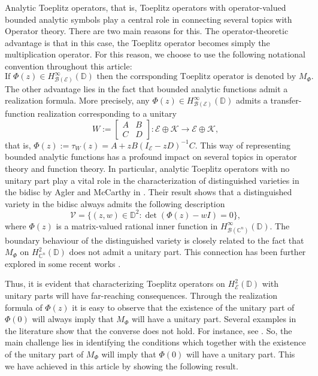 \documentclass[12pt]{amsart}
\numberwithin{equation}{section}
\theoremstyle{definition}
\newcommand{\D}{\mathbb{D}}
\newcommand{\1}{{\mbox{\bf 1}}}
\newcommand{\clb}{\mathcal{B}}
\newcommand{\cle}{\mathcal{E}}
\newcommand{\clk}{\mathcal{K}}
\newcommand{\raro}{\rightarrow}
\begin{document}
Analytic Toeplitz operators, that is, Toeplitz operators with operator-valued bounded analytic symbols play a central role in connecting several topics with Operator theory.  There are two main reasons for this. The operator-theoretic advantage is that in this case, the Toeplitz operator becomes simply the multiplication operator.  For this reason, we choose to use the following notational convention throughout this article: 
\[
\text{If } \Phi(z) \in H_{\clb(\cle)}^{\infty}(\D) \text{ then the corrsponding Toeplitz operator is denoted by } M_{\Phi}.
\]
The other advantage lies in the fact that bounded analytic functions admit a realization formula. More precisely, any $\Phi(z) \in H_{\clb(\cle)}^{\infty}(\D)$ admits a transfer-function realization corresponding to a unitary
\[
W:= \begin{bmatrix}
A &B\\
C &D
\end{bmatrix}:\cle \oplus \clk \raro \cle \oplus \clk,
\]
that is, $\Phi(z) := \tau_W(z) = A +zB(I_{\cle} - zD)^{-1}C$. This way of representing bounded analytic functions has a profound impact on several topics in operator theory and function theory.  In particular, analytic Toeplitz operators with no unitary part play a vital role in the characterization of distinguished varieties in the bidisc by Agler and McCarthy in \cite{AM}. Their result shows that a distinguished variety in the bidisc always admits the following description 
\[
\mathcal{V} = \{(z,w) \in \D^2: \det (\Phi(z) - wI)=0\},
\]
where $\Phi(z)$ is a matrix-valued rational inner function in $H_{\clb(\mathbb{C}^n)}^{\infty}(\D)$.  The boundary behaviour of the distinguished variety is closely related to the fact that $M_{\Phi}$ on $H_{\mathbb{C}^n}^2(\D)$ does not admit a unitary part. This connection has been further explored in some recent works \cite{DS, DSau}.

Thus, it is evident that characterizing Toeplitz operators on $H_{\cle}^2(\D)$ with unitary parts will have far-reaching consequences.  Through the realization formula of $\Phi(z)$ it is easy to observe that the existence of the unitary part of $\Phi(0)$ will always imply that $M_{\Phi}$ will have a unitary part. Several examples in the literature show that the converse does not hold. For instance, see \cite[Remark 3.2]{DSau}. So, the main challenge lies in identifying the conditions which together with the existence of the unitary part of $M_{\Phi}$ will imply that $\Phi(0)$ will have a unitary part. This we have achieved in this article by showing the following result.
\end{document}
